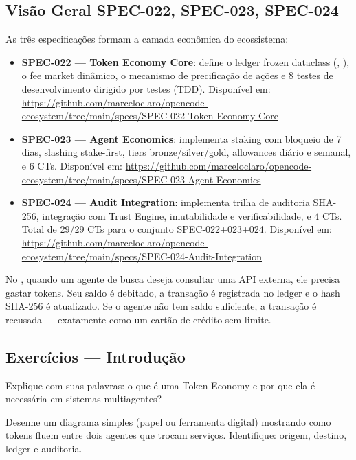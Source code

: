 \subsection{Visão Geral SPEC-022, SPEC-023, SPEC-024}

As três especificações formam a camada econômica do ecossistema:

\begin{itemize}
\item \textbf{SPEC-022 --- Token Economy Core}: define o ledger
frozen dataclass (,
), o fee market dinâmico, o mecanismo de
precificação de ações e 8 testes de desenvolvimento dirigido por
testes (TDD). Disponível em:
\url{https://github.com/marceloclaro/opencode-ecosystem/tree/main/specs/SPEC-022-Token-Economy-Core}
\item \textbf{SPEC-023 --- Agent Economics}: implementa staking
com bloqueio de 7 dias, slashing stake-first, tiers
bronze/silver/gold, allowances diário e semanal, e 6 CTs.
Disponível em:
\url{https://github.com/marceloclaro/opencode-ecosystem/tree/main/specs/SPEC-023-Agent-Economics}
\item \textbf{SPEC-024 --- Audit Integration}: implementa trilha
de auditoria SHA-256, integração com Trust Engine, imutabilidade
e verificabilidade, e 4 CTs. Total de 29/29 CTs para o conjunto
SPEC-022+023+024. Disponível em:
\url{https://github.com/marceloclaro/opencode-ecosystem/tree/main/specs/SPEC-024-Audit-Integration}
\end{itemize}

\begin{exemplo}
No \opencodeeco{}, quando um agente de busca deseja consultar uma
API externa, ele precisa gastar tokens. Seu saldo é debitado, a
transação é registrada no ledger e o hash SHA-256 é atualizado.
Se o agente não tem saldo suficiente, a transação é recusada —
exatamente como um cartão de crédito sem limite.
\end{exemplo}

\subsection{Exercícios — Introdução}

\begin{exercicio}[Nivel 0]
Explique com suas palavras: o que é uma Token Economy e por que
ela é necessária em sistemas multiagentes?
\end{exercicio}

\begin{exercicio}
Desenhe um diagrama simples (papel ou ferramenta digital)
mostrando como tokens fluem entre dois agentes que trocam serviços.
Identifique: origem, destino, ledger e auditoria.
\end{exercicio}

